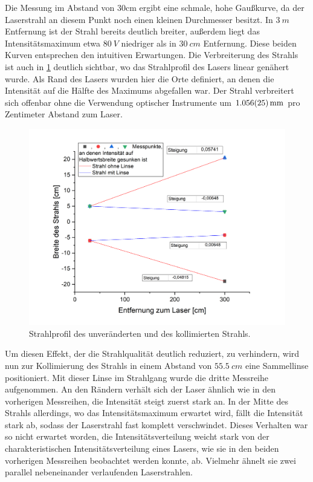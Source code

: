 \documentclass[
	a4paper,
	12pt,
	pagesize,
	ngerman
]{scrartcl}
\begin{document}
Die Messung im Abstand von 30cm ergibt eine schmale, hohe Gaußkurve, da der Laserstrahl an diesem Punkt noch einen kleinen Durchmesser besitzt. In $\SI{3}{m}$ Entfernung ist der Strahl bereits deutlich breiter, außerdem liegt das Intensitätsmaximum etwa $\SI{80}{V}$ niedriger als in $\SI{30}{cm}$ Entfernung. Diese beiden Kurven entsprechen den intuitiven Erwartungen. Die Verbreiterung des Strahls ist auch in \cref{strahlprofil} deutlich sichtbar, wo das Strahlprofil des Lasers linear genähert wurde. Als Rand des Lasers wurden hier die Orte definiert, an denen die Intensität auf die Hälfte des Maximums abgefallen war. Der Strahl verbreitert sich offenbar ohne die Verwendung optischer Instrumente um $\SI{1,056\pm0,025}{mm}$ pro Zentimeter Abstand zum Laser.

\begin{figure}[h!]
	\centering
	\includegraphics[scale=0.7]{strahlprofil.png}
	\caption{Strahlprofil des unveränderten und des kollimierten Strahls.}
	\label{strahlprofil}
\end{figure}

Um diesen Effekt, der die Strahlqualität deutlich reduziert, zu verhindern, wird nun zur Kollimierung des Strahls in einem Abstand von $\SI{55,5}{cm}$ eine Sammellinse positioniert. Mit dieser Linse im Strahlgang wurde die dritte Messreihe aufgenommen. An den Rändern verhält sich der Laser ähnlich wie in den vorherigen Messreihen, die Intensität steigt zuerst stark an. In der Mitte des Strahls allerdings, wo das Intensitätsmaximum erwartet wird, fällt die Intensität stark ab, sodass der Laserstrahl fast komplett verschwindet. Dieses Verhalten war so nicht erwartet worden, die Intensitätsverteilung weicht stark von der charakteristischen Intensitätsverteilung eines Lasers, wie sie in den beiden vorherigen Messreihen beobachtet werden konnte, ab. Vielmehr ähnelt sie zwei parallel nebeneinander verlaufenden Laserstrahlen.
\end{document}

